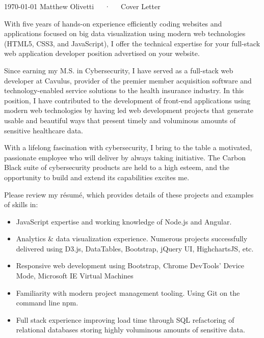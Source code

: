 \documentclass[11pt, a4paper]{awesome-cv}
\begin{document}
\makecvheader[C]

\makecvfooter
  {\today}
  {Matthew Olivetti~~~·~~~Cover Letter}
  {}

\makelettertitle

\begin{cvletter}

With five years of hands-on experience efficiently coding websites and applications focused on big data visualization using modern web technologies (HTML5, CSS3, and JavaScript), I offer the technical expertise for your full-stack web application developer position advertised on your website. 

Since earning my M.S. in Cybersecurity, I have served as a full-stack web developer at Cavulus, provider of the premier member acquisition software and technology-enabled service solutions to the health insurance industry. In this position, I have contributed to the development of front-end applications using modern web technologies by having led web development projects that generate usable and beautiful ways that present timely and voluminous amounts of sensitive healthcare data.

With a lifelong fascination with cybersecurity, I bring to the table a motivated, passionate employee who will deliver by always taking initiative. The Carbon Black suite of cybersecurity products are held to a high esteem, and the opportunity to build and extend its capabilities excites me. 

Please review my résumé, which provides details of these projects and examples of skills in:

\begin{itemize}
	\item JavaScript expertise and working knowledge of Node.js and Angular.
	\item Analytics \& data visualization experience. Numerous projects successfully delivered using D3.js, DataTables, Bootstrap, jQuery UI, HighchartsJS, etc.
	\item Responsive web development using Bootstrap, Chrome DevTools' Device Mode, Microsoft IE Virtual Machines
	\item Familiarity with modern project management tooling. Using Git on the command line npm.
	\item Full stack experience improving load time through SQL refactoring of relational databases storing highly voluminous amounts of sensitive data.
\end{itemize}


\end{cvletter}
\end{document}
